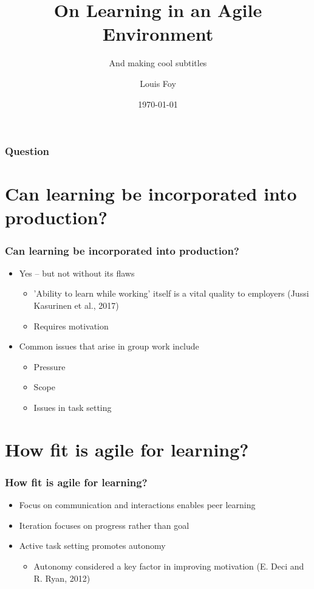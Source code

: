 \documentclass{beamer}
\title{On Learning in an Agile Environment}
\subtitle{And making cool subtitles}
\author{Louis Foy}
\institute{Falmouth University}
\date{\today}
\begin{document}
\begin{frame}
	\titlepage
\end{frame}

\begin{frame}
	\frametitle{Question}
	\tableofcontents
\end{frame}

\section{Can learning be incorporated into production?}
\begin{frame}
	\frametitle{Can learning be incorporated into production?}
	\begin{itemize}
		\item Yes -- but not without its flaws
		\begin{itemize}
			\item 'Ability to learn while working' itself is a vital quality to employers (Jussi Kasurinen et al., 2017)
			\item Requires motivation
		\end{itemize}
	\end{itemize}
	\begin{itemize}
		\item Common issues that arise in group work include
		\begin{itemize}
			\item Pressure
			\item Scope
			\item Issues in task setting
		\end{itemize}
	\end{itemize}
\end{frame}

\section{How fit is agile for learning?}
\begin{frame}
	\frametitle{How fit is agile for learning?}
	\begin{itemize}
		\item Focus on communication and interactions enables peer learning
		\item Iteration focuses on progress rather than goal
		\item Active task setting promotes autonomy
		\begin{itemize}
			\item Autonomy considered a key factor in improving motivation (E. Deci and R. Ryan, 2012)
		\end{itemize}
	\end{itemize}
\end{frame}
\end{document}
